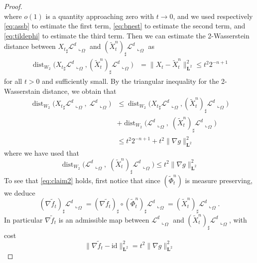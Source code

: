 \documentclass[11pt, twoside, reqno]{amsart}
\newcounter{clai}
\theoremstyle{definition} \newtheorem{definition}{Definition}[section]
\theoremstyle{definition} \newtheorem{remark}[definition]{Remark}
\theoremstyle{plain} \newtheorem{lemma}[definition]{Lemma}
\theoremstyle{plain} \newtheorem{proposition}[definition]{Proposition}
\theoremstyle{plain} \newtheorem{theorem}[definition]{Theorem}
\theoremstyle{plain} \newtheorem{corollary}[definition]{Corollary}
\theoremstyle{definition} \newtheorem{example}[definition]{Example}
\theoremstyle{plain} \newtheorem{claim}[clai]{Claim}
\theoremstyle{definition} \newtheorem{assumption}[definition]{Assumption}
\DeclareMathOperator{\dist}{dist}
\newcommand{\Id}{\mathrm{id}}
\newcommand{\1}{\mathbbm 1}
\newcommand{\rest}{\llcorner}
\numberwithin{equation}{section} %
\theoremstyle{plain} \newtheorem*{theorem*}{Theorem}
\theoremstyle{plain} \newtheorem{mthm}[maintheorem]{Main Theorem}
\theoremstyle{plain} \newtheorem*{mthm*}{Main Theorem}
\theoremstyle{plain} \newtheorem*{conjecture*}{Conjecture}
\theoremstyle{plain} \newtheorem{conjecture}[definition]{Conjecture}
\theoremstyle{plain} \newtheorem*{problem*}{Problem}
\begin{document}
\begin{proof}
\begin{equation}
\end{equation}
where $o(1)$ is a quantity approaching zero with $t \to 0$, and we used respectively \eqref{eq:assb} to estimate the first term, \eqref{eq:bnest} to estimate the second term, and \eqref{eq:tildephi} to estimate the third term.
Then we can estimate the 2-Wasserstein distance between
${X_t}_\sharp \mathscr L^d \rest_{\Omega}$ and ${(\tilde X^n_t)}_\sharp \mathscr L^d \rest_{\Omega}$ as
\begin{equation}\label{eq:cost1}
\begin{aligned}
\dist_{W_2} \big( {X_t}_\sharp \mathscr L^d \rest_{\Omega},{(\tilde X^n_t)}_\sharp \mathscr L^d \rest_{\Omega} \big) & = \|X_t- \tilde X_t^n\|^2_{\mathbf L^2} \leq  t^2 2^{-n+1}
\end{aligned}
\end{equation}
for all $t>0$ and sufficiently small. By the triangular inequality for the 2-Wasserstain distance, we obtain that 
\begin{equation}
    \begin{aligned}
        \dist_{W_2} \big( {X_t}_\sharp \mathscr L^d \rest_{\Omega}, \; \mathscr L^d \rest_\Omega \big)&  \leq \dist_{W_2} \big( {X_t}_\sharp \mathscr L^d \rest_{\Omega},{(\tilde X^n_t)}_\sharp \mathscr L^d \rest_{\Omega} \big)  \\
        & +\dist_{W_2} \big(  \mathscr L^d \rest_\Omega, \; (\tilde X^n_t)_\sharp \mathscr L^d \rest_{\Omega}\big)  \\
         & \leq t^2 2^{-n+1} + t^2\|\nabla g\|_{\mathbf L^2}^2
    \end{aligned}
\end{equation}
where we have used that 
\begin{equation}\label{eq:claim2}
\dist_{W_2} \big(  \mathscr L^d \rest_\Omega, \; (\tilde X^n_t)_\sharp \mathscr L^d \rest_{\Omega}\big) \leq t^2 \|\nabla g\|_{\mathbf L^2}^2
\end{equation}
To see that \eqref{eq:claim2} holds, first notice that since $(\tilde \Phi^n_t)$ is measure preserving, we deduce
\begin{equation}
(\nabla \tilde f_t)_\sharp \mathscr L^d \rest_\Omega = (\nabla \tilde f_t)_\sharp \circ (\tilde \Phi^n_t)_\sharp \mathscr L^d \rest_\Omega =(\tilde X^n_t)_\sharp \mathscr L^d \rest_{\Omega}.
\end{equation}
In particular $\nabla \tilde f_t$ is an admissible map between $\mathscr L^d \rest_\Omega$ and $(\tilde X^n_t)_\sharp \mathscr L^d \rest_{\Omega}$, with cost 
$$
\|\nabla \tilde f_t - \Id\|_{\mathbf L^2}^2 = t^2\|\nabla g\|_{\mathbf L^2}^2
$$
\end{proof}
\end{document}
